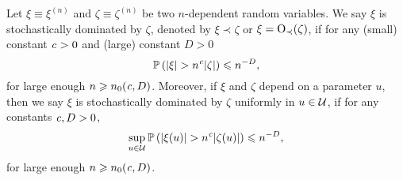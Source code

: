 \begin{definition}\label{stoch_domination}
Let $\xi\equiv \xi^{(n)}$ and $\zeta\equiv \zeta^{(n)}$ be two $n$-dependent random variables.
We say $\xi$ is stochastically dominated by $\zeta$, denoted by $\xi\prec \zeta$ or $\xi=\OO_\prec(\zeta)$, if for any (small) constant $\e>0$ and (large) constant $D>0$
\[ \bbP\left(|\xi| >n^\e |\zeta|\right)\le n^{-D}, \]
for large enough $n\ge n_0(\e, D)$. Moreover, if $\xi$ and $\zeta$ depend on a parameter $u$, then we say $\xi$ is stochastically dominated by $\zeta$ uniformly in $u\in \cal U$,  if for any constants $\e,D>0$,
\[\sup_{u\in \cal U}\bbP\left(|\xi(u)|>n^\e |\zeta(u)|\right)\le n^{-D}, \]
for large enough $n\ge n_0(\e, D)$.
\end{definition}

